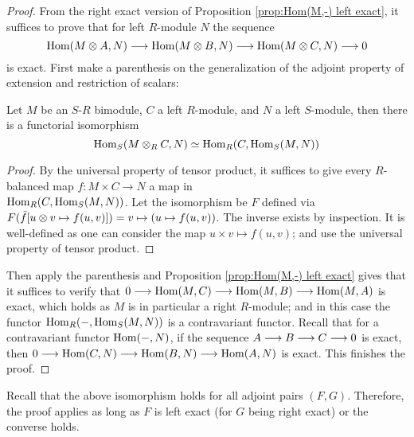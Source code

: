 \documentclass{article}
\begin{document}
\begin{proof}
    From the right exact version of Proposition \ref{prop:Hom(M,-) left exact}, it suffices to prove that for left $R$-module $N$ the sequence
    \[
        \mathrm{Hom}(M \otimes A, N) \longrightarrow \mathrm{Hom}(M \otimes B, N) \longrightarrow \mathrm{Hom}(M \otimes C, N) \longrightarrow 0
    \]
    is exact. First make a parenthesis on the generalization of the adjoint property of extension and restriction of scalars:

    \begin{parenthesis}
        Let $M$ be an $S$-$R$ bimodule, $C$ a left $R$-module, and $N$ a left $S$-module, then there is a functorial isomorphism
        \[
            \mathrm{Hom}_S(M \otimes_R C, N) \simeq \mathrm{Hom}_R(C, \mathrm{Hom}_S(M, N))
        \]
    \end{parenthesis}

    \begin{proof}
        By the universal property of tensor product, it suffices to give every $R$-balanced map $f: M \times C \to N$ a map in \\ $\mathrm{Hom}_R(C, \mathrm{Hom}_S(M, N))$. Let the isomorphism be $F$ defined via $F(\tilde{f}[u\otimes v \mapsto f(u, v)]) = v\mapsto (u \mapsto f(u, v))$. The inverse exists by inspection. It is well-defined as one can consider the map $u \times v \mapsto f(u, v)$; and use the universal property of tensor product.
    \end{proof}

    Then apply the parenthesis and Proposition \ref{prop:Hom(M,-) left exact} gives that it suffices to verify that $0 \longrightarrow \mathrm{Hom}(M, C) \longrightarrow \mathrm{Hom}(M, B) \longrightarrow \mathrm{Hom}(M, A)$ is exact, which holds as $M$ is in particular a right $R$-module; and in this case the functor $\mathrm{Hom}_R(-, \mathrm{Hom}_S(M, N))$ is a contravariant functor. Recall that for a contravariant functor $\mathrm{Hom}(-, N)$, if the sequence $A \longrightarrow B \longrightarrow C \longrightarrow 0$ is exact, then $0 \longrightarrow \mathrm{Hom}(C, N) \longrightarrow \mathrm{Hom}(B, N) \longrightarrow \mathrm{Hom}(A, N)$ is exact. This finishes the proof.
\end{proof}

\begin{remark}
    Recall that the above isomorphism holds for all adjoint pairs $(F, G)$. Therefore, the proof applies as long as $F$ is left exact (for $G$ being right exact) or the converse holds. 
\end{remark}
\end{document}
